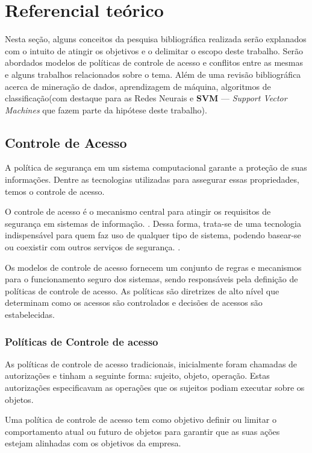 \chapter{Referencial teórico}\label{referencial_teorico}
Nesta seção, alguns conceitos da pesquisa bibliográfica realizada serão explanados com o intuito de atingir os objetivos e o delimitar o escopo deste trabalho. Serão abordados modelos de políticas de controle de acesso e conflitos entre as mesmas e alguns trabalhos relacionados sobre o tema. Além de uma revisão bibliográfica acerca de mineração de dados, aprendizagem de máquina, algoritmos de classificação(com destaque para as Redes Neurais e \textbf{SVM} --- \textit{Support Vector Machines} que fazem parte da hipótese deste trabalho).


\section{Controle de Acesso} \label{controle_acesso}
A política de segurança em um sistema computacional garante a proteção de suas informações. Dentre as tecnologias utilizadas para assegurar essas propriedades, temos o controle de acesso. \cite{sarkis:artigo:2016}

O controle de acesso é o mecanismo central para atingir os requisitos de segurança em  sistemas  de  informação. \cite{wang_conflicts_2010}. Dessa forma,  trata-se  de  uma  tecnologia indispensável para quem faz uso de qualquer tipo de sistema, podendo basear-se ou coexistir com outros serviços de segurança. \cite{sandhu:1996}.

Os modelos de controle de acesso fornecem um conjunto de regras e mecanismos para o funcionamento seguro dos sistemas, sendo responsáveis pela definição de políticas de controle de acesso. As políticas são diretrizes de alto nível que determinam como os acessos são controlados e decisões de acessos são estabelecidas. \cite{di_vimercati_policies_2005} \cite{sarkis2017}	


\subsection{Políticas de Controle de acesso}
As políticas de controle de acesso tradicionais, inicialmente foram chamadas de autorizações e tinham a seguinte forma: {sujeito, objeto, operação}. Estas autorizações especificavam as operações que os sujeitos podiam executar sobre os objetos. \cite{di_vimercati_policies_2005}\cite{sarkis2017}

Uma política de controle de acesso tem como objetivo definir ou limitar o comportamento atual ou futuro de objetos para garantir que as suas ações estejam alinhadas com os objetivos da empresa.\cite{dunlop_dynamic_2002}\cite{sarkis2017}



